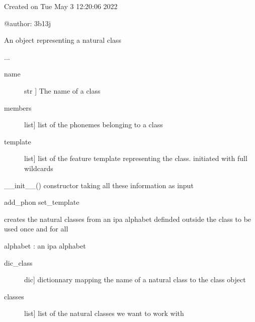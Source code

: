 \documentclass[letterpaper,10pt,english]{sphinxmanual}
\begin{document}
\label{\detokenize{index:module-Natural_class}}
\sphinxAtStartPar
Created on Tue May  3 12:20:06 2022

\sphinxAtStartPar
@author: 3b13j

\begin{fulllineitems}
\label{\detokenize{index:Natural_class.Natural_class}}
\sphinxAtStartPar
An object representing a natural class

\sphinxAtStartPar
...
\begin{description}
\item[{name}] \leavevmode{[}str {]}
\sphinxAtStartPar
The name of a class

\item[{members}] \leavevmode{[}list{]}
\sphinxAtStartPar
list of the phonemes belonging to a class

\item[{template}] \leavevmode{[}list{]}
\sphinxAtStartPar
list of the feature template representing the class. initiated with full wildcards

\end{description}

\sphinxAtStartPar
\_\_init\_\_() constructor taking all these information as input

\sphinxAtStartPar
add\_phon
set\_template

\end{fulllineitems}


\begin{fulllineitems}
\label{\detokenize{index:Natural_class.create_classes}}
\sphinxAtStartPar
creates the natural classes from an ipa alphabet
definded outside the class to be used once and for all

\sphinxAtStartPar
alphabet : an ipa alphabet
\begin{description}
\item[{dic\_class}] \leavevmode{[}dic{]}
\sphinxAtStartPar
dictionnary mapping the name of a natural class to the class object

\item[{classes}] \leavevmode{[}list{]}
\sphinxAtStartPar
list of the natural classes we want to work with

\end{description}

\end{fulllineitems}
\end{document}

